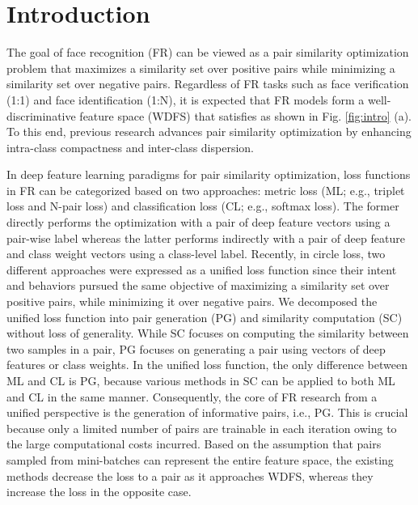\documentclass[10pt,twocolumn]{article}
\begin{document}

\section{Introduction}
The goal of face recognition (FR) can be viewed as a pair similarity optimization problem that maximizes a similarity set  over positive pairs while minimizing a similarity set  over negative pairs. Regardless of FR tasks such as face verification (1:1) and face identification (1:N), it is expected that FR models form a well-discriminative feature space (WDFS) that satisfies  as shown in Fig. \ref{fig:intro} (a). To this end, previous research advances pair similarity optimization\cite{sun2020circle, wang2019multi, yu2019deep, liu2017sphereface, deng2019arcface, wang2018cosface, meng2021magface} by enhancing intra-class compactness and inter-class dispersion.

In deep feature learning paradigms for pair similarity optimization, loss functions in FR can be categorized based on two approaches: metric loss (ML; e.g., triplet loss\cite{schroff2015facenet, hoffer2015deep} and N-pair loss\cite{sohn2016improved}) and classification loss (CL; e.g., softmax loss\cite{cao2018vggface2,deepface-recognition,taigman2014deepface}). The former directly performs the optimization with a pair of deep feature vectors using a pair-wise label whereas the latter performs indirectly with a pair of deep feature and class weight vectors using a class-level label. Recently, in circle loss\cite{sun2020circle}, two different approaches were expressed as a unified loss function since their intent and behaviors pursued the same objective of maximizing a similarity set  over positive pairs, while minimizing it over negative pairs. We decomposed the unified loss function into pair generation (PG) and similarity computation (SC) without loss of generality. While SC focuses on computing the similarity between two samples in a pair, PG focuses on generating a pair using vectors of deep features or class weights. In the unified loss function, the only difference between ML and CL is PG, because various methods in SC can be applied to both ML and CL in the same manner. Consequently, the core of FR research from a unified perspective is the generation of informative pairs, i.e., PG. This is crucial because only a limited number of pairs are trainable in each iteration owing to the large computational costs incurred. Based on the assumption that pairs sampled from mini-batches can represent the entire feature space, the existing methods decrease the loss to a pair as it approaches WDFS, whereas they increase the loss in the opposite case.
\end{document}
